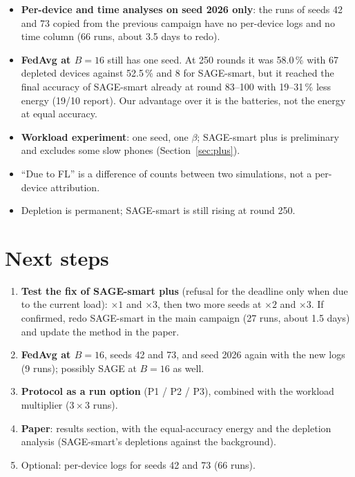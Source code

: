 \documentclass[11pt,a4paper]{article}
\begin{document}
\begin{itemize}
  \item \textbf{Per-device and time analyses on seed 2026 only}: the runs of
        seeds 42 and 73 copied from the previous campaign have no per-device
        logs and no time column (66 runs, about 3.5 days to redo).
  \item \textbf{FedAvg at $B=16$} still has one seed. At 250 rounds it was
        58.0\,\% with 67 depleted devices against 52.5\,\% and 8 for SAGE-smart,
        but it reached the final accuracy of SAGE-smart already at round 83--100
        with 19--31\,\% less energy (19/10 report). Our advantage over it is the
        batteries, not the energy at equal accuracy.
  \item \textbf{Workload experiment}: one seed, one $\beta$; SAGE-smart plus
        is preliminary and excludes some slow phones (Section~\ref{sec:plus}).
  \item ``Due to FL'' is a difference of counts between two simulations, not a
        per-device attribution.
  \item Depletion is permanent; SAGE-smart is still rising at round 250.
\end{itemize}

\section{Next steps}

\begin{enumerate}
  \item \textbf{Test the fix of SAGE-smart plus} (refusal for the deadline only
        when due to the current load): $\times1$ and $\times3$, then two more
        seeds at $\times2$ and $\times3$. If confirmed, redo SAGE-smart in the
        main campaign (27 runs, about 1.5 days) and update the method in the
        paper.
  \item \textbf{FedAvg at $B=16$}, seeds 42 and 73, and seed 2026 again with the
        new logs (9 runs); possibly SAGE at $B=16$ as well.
  \item \textbf{Protocol as a run option} (P1 / P2 / P3), combined with the
        workload multiplier ($3\times3$ runs).
  \item \textbf{Paper}: results section, with the equal-accuracy energy and the
        depletion analysis (SAGE-smart's depletions against the background).
  \item Optional: per-device logs for seeds 42 and 73 (66 runs).
\end{enumerate}
\end{document}
